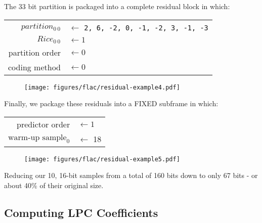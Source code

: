 \clearpage

The 33 bit partition is packaged into a complete residual block
in which:
\newline
\begin{tabular}{rl}
$partition_{0~0}$ & $\leftarrow$ \texttt{2, 6, -2, 0, -1, -2, 3, -1, -3} \\
$Rice_{0~0}$ & $\leftarrow 1$ \\
partition order & $\leftarrow 0$ \\
coding method & $\leftarrow 0$ \\
\end{tabular}
\begin{figure}[h]
\texttt{[image: figures/flac/residual-example4.pdf]}
\end{figure}
\par
Finally, we package these residuals into a FIXED subframe in which:
\newline
\begin{tabular}{rl}
predictor order & $\leftarrow 1$ \\
$\text{warm-up sample}_0$ & $\leftarrow $ 18 \\
\end{tabular}
\begin{figure}[h]
\texttt{[image: figures/flac/residual-example5.pdf]}
\end{figure}
\par
\noindent
Reducing our 10, 16-bit samples from a total of 160 bits
down to only 67 bits - or about 40\% of their original size.

\clearpage

\subsection{Computing LPC Coefficients}

